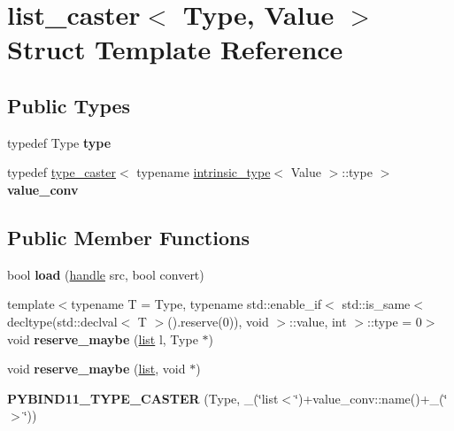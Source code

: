\hypertarget{structlist__caster}{}\section{list\+\_\+caster$<$ Type, Value $>$ Struct Template Reference}
\label{structlist__caster}
\subsection*{Public Types}
\begin{DoxyCompactItemize}
\item 
typedef Type {\bfseries type}\hypertarget{structlist__caster_a347fc8b677e2399b5fbe35f3f26400ad}{}\label{structlist__caster_a347fc8b677e2399b5fbe35f3f26400ad}

\item 
typedef \hyperlink{classtype__caster}{type\+\_\+caster}$<$ typename \hyperlink{structintrinsic__type}{intrinsic\+\_\+type}$<$ Value $>$\+::type $>$ {\bfseries value\+\_\+conv}\hypertarget{structlist__caster_a2d5b1805a94ca0afb0a3bbf193bfff07}{}\label{structlist__caster_a2d5b1805a94ca0afb0a3bbf193bfff07}

\end{DoxyCompactItemize}
\subsection*{Public Member Functions}
\begin{DoxyCompactItemize}
\item 
bool {\bfseries load} (\hyperlink{classhandle}{handle} src, bool convert)\hypertarget{structlist__caster_a6f4b4e4679fc465e40ef9f45480c3467}{}\label{structlist__caster_a6f4b4e4679fc465e40ef9f45480c3467}

\item 
{\footnotesize template$<$typename T  = Type, typename std\+::enable\+\_\+if$<$ std\+::is\+\_\+same$<$ decltype(std\+::declval$<$ T $>$().\+reserve(0)), void $>$\+::value, int $>$\+::type  = 0$>$ }\\void {\bfseries reserve\+\_\+maybe} (\hyperlink{classlist}{list} l, Type $\ast$)\hypertarget{structlist__caster_a7a15e8f1e9199d52c0ed9a03d75aa826}{}\label{structlist__caster_a7a15e8f1e9199d52c0ed9a03d75aa826}

\item 
void {\bfseries reserve\+\_\+maybe} (\hyperlink{classlist}{list}, void $\ast$)\hypertarget{structlist__caster_a1ba6972136b940a6262d27a99089b413}{}\label{structlist__caster_a1ba6972136b940a6262d27a99089b413}

\item 
{\bfseries P\+Y\+B\+I\+N\+D11\+\_\+\+T\+Y\+P\+E\+\_\+\+C\+A\+S\+T\+ER} (Type, \+\_\+(\char`\"{}list$<$\char`\"{})+value\+\_\+conv\+::name()+\+\_\+(\char`\"{}$>$\char`\"{}))\hypertarget{structlist__caster_a67901b27e2b43491e126980cc568d2ab}{}\label{structlist__caster_a67901b27e2b43491e126980cc568d2ab}

\end{DoxyCompactItemize}

